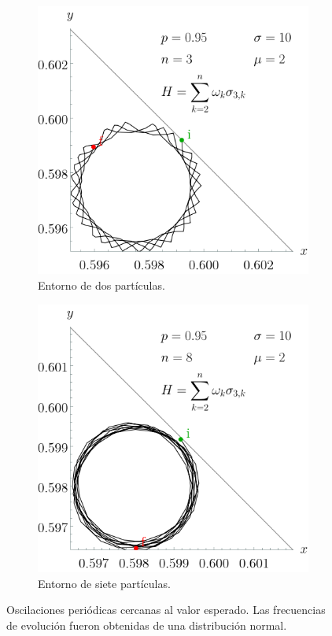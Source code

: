 \begin{figure}[ht!]
    \centering
    \begin{subfigure}{0.5\textwidth}
      \centering
      \includegraphics[width=0.9\linewidth]{chapter3/figures_separable/sphere_traject_sigmaz_normal_freq_mean=2_std=10_n=3_p=0.95_both.png}
      \caption{Entorno de dos partículas.}
    \end{subfigure}%
    \begin{subfigure}{0.5\textwidth}
      \centering
      \includegraphics[width=0.9\linewidth]{chapter3/figures_separable/sphere_traject_sigmaz_normal_freq_mean=2_std=10_n=8_p=0.95_both.png}
      \caption{Entorno de siete partículas.}
    \end{subfigure}
    \caption{Oscilaciones periódicas cercanas al valor esperado. Las frecuencias de evolución fueron obtenidas de una distribución normal.}\label{fig:OscilationsNormalFreqBigSigm}
\end{figure}


